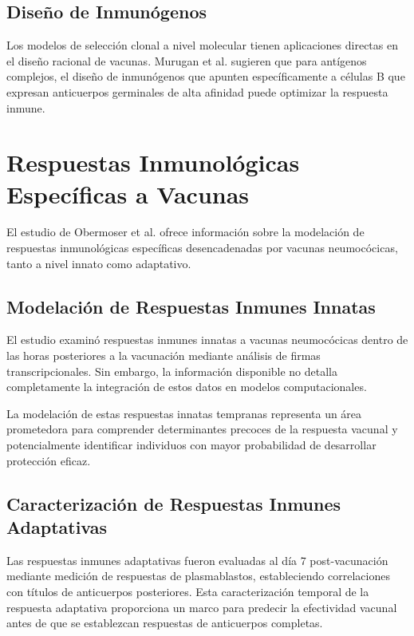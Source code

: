\subsection{Diseño de Inmunógenos}

Los modelos de selección clonal a nivel molecular tienen aplicaciones directas en el diseño racional de vacunas. Murugan et al. \cite{Murugan2018} sugieren que para antígenos complejos, el diseño de inmunógenos que apunten específicamente a células B que expresan anticuerpos germinales de alta afinidad puede optimizar la respuesta inmune.


\section{Respuestas Inmunológicas Específicas a Vacunas}

El estudio de Obermoser et al. \cite{Obermoser2013} ofrece información sobre la modelación de respuestas inmunológicas específicas desencadenadas por vacunas neumocócicas, tanto a nivel innato como adaptativo.

\subsection{Modelación de Respuestas Inmunes Innatas}

El estudio examinó respuestas inmunes innatas a vacunas neumocócicas dentro de las horas posteriores a la vacunación mediante análisis de firmas transcripcionales. Sin embargo, la información disponible no detalla completamente la integración de estos datos en modelos computacionales.

La modelación de estas respuestas innatas tempranas representa un área prometedora para comprender determinantes precoces de la respuesta vacunal y potencialmente identificar individuos con mayor probabilidad de desarrollar protección eficaz.

\subsection{Caracterización de Respuestas Inmunes Adaptativas}

Las respuestas inmunes adaptativas fueron evaluadas al día 7 post-vacunación mediante medición de respuestas de plasmablastos, estableciendo correlaciones con títulos de anticuerpos posteriores. Esta caracterización temporal de la respuesta adaptativa proporciona un marco para predecir la efectividad vacunal antes de que se establezcan respuestas de anticuerpos completas.

